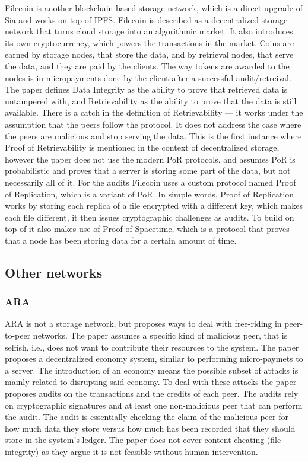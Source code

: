 Filecoin \cite{filecoin} is another blockchain-based storage network,
which is a direct upgrade of Sia and works on top of IPFS.
Filecoin is described as a decentralized storage network that turns cloud storage into an algorithmic market.
It also introduces its own cryptocurrency, which powers the transactions in the market.
Coins are earned by storage nodes, that store the data, and by retrieval nodes, that serve the data,
and they are paid by the clients.
The way tokens are awarded to the nodes is in micropayments done by the client after a successful audit/retreival.
The paper defines Data Integrity as the ability to prove that retrieved data is untampered with,
and Retrievability as the ability to prove that the data is still available.
There is a catch in the definition of Retrievability --- it works under the assumption that the peers
follow the protocol.
It does not address the case where the peers are malicious and stop serving the data.
This is the first instance where Proof of Retrievability is mentioned in the context of decentralized storage,
however the paper does not use the modern PoR protocols, and assumes PoR is probabilistic and proves
that a server is storing some part of the data, but not necessarily all of it.
For the audits Filecoin uses a custom protocol named Proof of Replication, which is a variant of PoR.
In simple words, Proof of Replication works by storing each replica of a file encrypted with a different key,
which makes each file different, it then issues cryptographic challenges as audits.
To build on top of it also makes use of Proof of Spacetime, which is a protocol that proves that a node
has been storing data for a certain amount of time.

\subsection{Other networks}

\subsubsection{ARA}

ARA is not a storage network, but proposes ways to deal with free-riding in peer-to-peer networks.
The paper assumes a specific kind of malicious peer, that is selfish, i.e., does not want to contribute their resources to the system.
The paper proposes a decentralized economy system, similar to performing micro-paymets to a server.
The introduction of an economy means the possible subset of attacks is mainly related to disrupting said economy.
To deal with these attacks the paper proposes audits on the transactions and the credits of each peer.
The audits rely on cryptographic signatures and at least one non-malicious peer that can perform the audit.
The audit is essentially checking the claim of the malicious peer for how much data they store versus how much has been recorded that they should store in the system's ledger.
The paper does not cover content cheating (file integrity) as they argue it is not feasible without human intervention.

